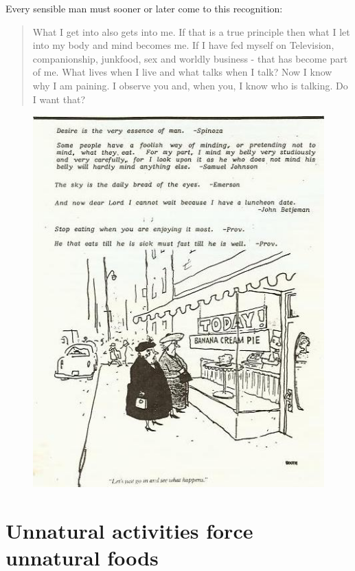 \documentclass[12pt,letterpaper]{article}
\begin{document}
Every sensible man must sooner or later come to this recognition:
\begin{quote} What I get into also gets into me. If that is a true
principle then what I let into my body and mind becomes me. If I have
fed myself on Television, companionship, junkfood, sex and worldly
business - that has become part of me. What lives when I live and what
talks when I talk? Now I know why I am paining. I observe you and,
when you, I know who is talking. Do I want that?
\end{quote}


\begin{figure} \centering
  \includegraphics[width=\textwidth]{p14.jpg}
\end{figure}

\section{Unnatural activities force unnatural foods}
\end{document}
